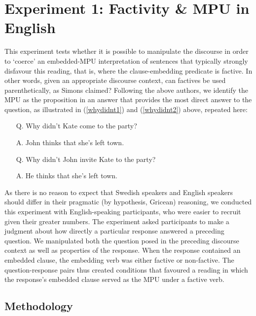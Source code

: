 \documentclass[output=paper]{LSP/langsci}
\begin{document}
\section{Experiment 1:  Factivity \& MPU in English}

This experiment tests whether it is possible to manipulate the discourse in order to `coerce' an embedded-MPU interpretation of sentences that typically strongly disfavour this reading, that is, where the clause-embedding predicate is factive. In other words, given an appropriate discourse context, can factives be used parenthetically, as Simons claimed? Following the above authors, we identify the MPU as the proposition in an answer that provides the most direct answer to the question, as illustrated in (\ref{whydidnt1}) and (\ref{whydidnt2}) above, repeated here:


\begin{exe}
	\ex \begin{itemize}
		\item[Q.] Why didn't Kate come to the party?
		\item[A.] John thinks that she's left town.
	\end{itemize}  
	\ex \begin{itemize}
		\item[Q.] Why didn't John invite Kate to the party?
		\item[A.] He thinks that she's left town.
	\end{itemize}
\end{exe}

As there is no reason to expect that Swedish speakers and English speakers should differ in their pragmatic (by hypothesis, Gricean) reasoning, we conducted this experiment with English-speaking participants, who were easier to recruit given their greater numbers. The experiment asked participants to make a judgment about how directly a particular response answered a preceding question.  We manipulated both the question posed in the preceding discourse context as well as properties of the response.  When the response contained an embedded clause, the embedding verb was either factive or non-factive. The question-response pairs thus created conditions that favoured a reading in which the response's embedded clause served as the MPU under a factive verb.


\subsection{Methodology}
\end{document}
